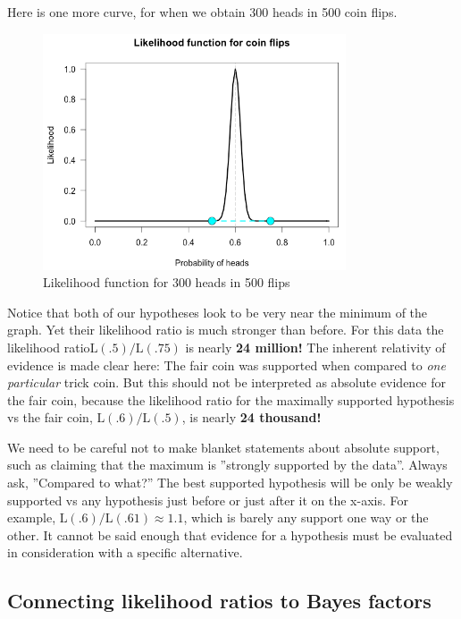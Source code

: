 Here is one more curve, for when we obtain 300 heads in 500 coin flips.

\begin{figure}[h]
    \centering
\includegraphics[width=0.8\textwidth]{pic/p05c03-snip04.png}
    \caption{Likelihood function for  300 heads in 500  flips}
    \label{fig:p05c03-snip04}
\end{figure}

Notice that both of our hypotheses look to be very near the minimum of the graph. Yet their likelihood ratio is much stronger than before. For this data the likelihood ratio$\mathrm{L}(.5) / \mathrm{L}(.75)$ is nearly \textbf{24 million!} The inherent relativity of evidence is made clear here: The fair coin was supported when compared to \textit{one particular} trick coin. But this should not be interpreted as absolute evidence for the fair coin, because the likelihood ratio for the maximally supported hypothesis vs the fair coin, $\mathrm{L}(.6) / \mathrm{L}(.5)$, is nearly \textbf{24 thousand!}

We need to be careful not to make blanket statements about absolute support, such as claiming that the maximum is ''strongly supported by the data''. Always ask, ''Compared to what?'' The best supported hypothesis will be only be weakly supported vs any hypothesis just before or just after it on the x-axis. For example, $\mathrm{L}(.6) / \mathrm{L}(.61) \approx 1.1$, which is barely any support one way or the other. It cannot be said enough that evidence for a hypothesis must be evaluated in consideration with a specific alternative.

\subsection{Connecting likelihood ratios to Bayes factors}

